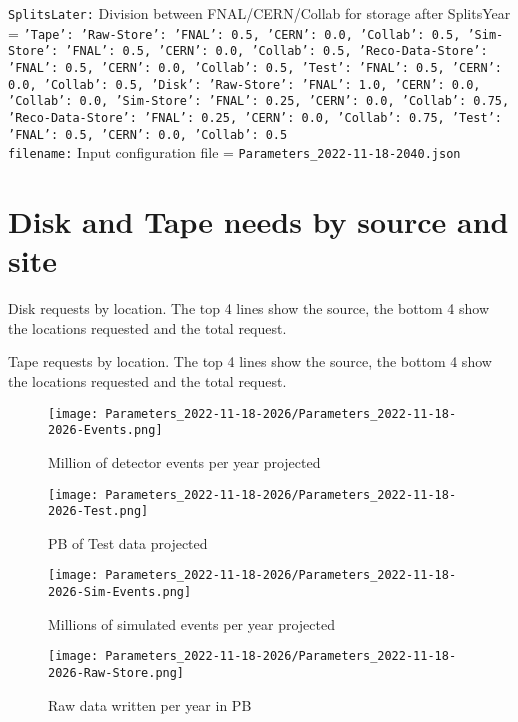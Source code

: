 {\tt SplitsLater:} Division between FNAL/CERN/Collab for storage after SplitsYear = {\tt {'Tape': {'Raw-Store': {'FNAL': 0.5, 'CERN': 0.0, 'Collab': 0.5}, 'Sim-Store': {'FNAL': 0.5, 'CERN': 0.0, 'Collab': 0.5}, 'Reco-Data-Store': {'FNAL': 0.5, 'CERN': 0.0, 'Collab': 0.5}, 'Test': {'FNAL': 0.5, 'CERN': 0.0, 'Collab': 0.5}}, 'Disk': {'Raw-Store': {'FNAL': 1.0, 'CERN': 0.0, 'Collab': 0.0}, 'Sim-Store': {'FNAL': 0.25, 'CERN': 0.0, 'Collab': 0.75}, 'Reco-Data-Store': {'FNAL': 0.25, 'CERN': 0.0, 'Collab': 0.75}, 'Test': {'FNAL': 0.5, 'CERN': 0.0, 'Collab': 0.5}}}} \\
{\tt filename:} Input configuration file = {\tt Parameters\_2022-11-18-2040.json} \\
\section{Disk and Tape needs by source and site}
\begin{table}[h]
\centering{}\label{tab:Cumulative-Disk
}
\caption{Disk requests by location. The top 4 lines show the source, the bottom 4 show the locations requested and the total request.}
\end{table}
\begin{table}[h]
\centering{}\label{tab:Cumulative-Tape
}
\caption{Tape requests by location. The top 4 lines show the source, the bottom 4 show the locations requested and the total request.}
\end{table}
\clearpage
\begin{figure}[h]
\centering\texttt{[image: Parameters\_2022-11-18-2026/Parameters\_2022-11-18-2026-Events.png]}\label{fig:Events}
\caption{Million of detector events per year projected}
\end{figure}
\begin{figure}[h]
\centering\texttt{[image: Parameters\_2022-11-18-2026/Parameters\_2022-11-18-2026-Test.png]}\label{fig:Test}
\caption{PB of Test data projected}
\end{figure}
\begin{figure}[h]
\centering\texttt{[image: Parameters\_2022-11-18-2026/Parameters\_2022-11-18-2026-Sim-Events.png]}\label{fig:Sim-Events}
\caption{Millions of simulated events per year projected}
\end{figure}
\begin{figure}[h]
\centering\texttt{[image: Parameters\_2022-11-18-2026/Parameters\_2022-11-18-2026-Raw-Store.png]}\label{fig:Raw-Store}
\caption{Raw data written per year in PB}
\end{figure}
